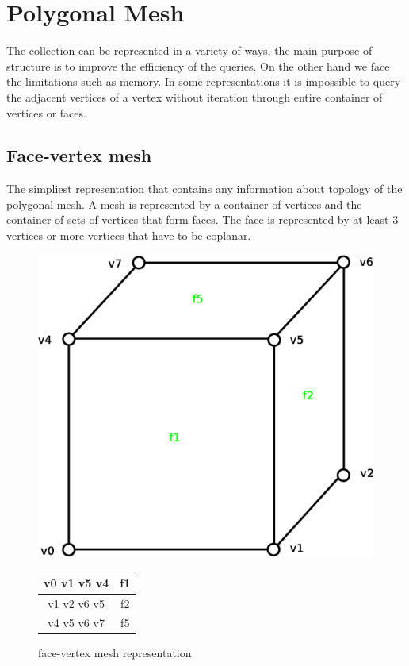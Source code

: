 \section{Polygonal Mesh}

The collection can be represented in a variety of ways, the main purpose of structure is to improve
the efficiency of the queries. On the other hand we face the limitations such as memory. In some
representations it is impossible to query the adjacent vertices of a vertex without iteration through
entire container of vertices or faces.

\subsection{Face-vertex mesh}
\label{sec:face-vertex}

The simpliest representation that contains any information about topology of the polygonal
mesh. A mesh is represented by a container of vertices and the container of sets of vertices that
form faces\cite{Zara2004}. The face is represented by at least 3 vertices or more vertices that have to be
coplanar.\\

\begin{figure}[h]

\begin{minipage}[hb]{0.65\linewidth}
\centering
\includegraphics[width=0.6\linewidth]{../img/fv_rep_mesh.eps}
\label{fig:figure1}
\end{minipage}
\hspace{0.5cm}
\begin{minipage}[hb]{0.25\linewidth}
\centering
\begin{tabular}{|c|c|}
\hline
\textsf{v0 v1 v5 v4} & \textsf{f1}\\
\hline
\textsf{v1 v2 v6 v5} & \textsf{f2}\\
\hline
\textsf{v4 v5 v6 v7} & \textsf{f5}\\
\hline
\end{tabular}
\label{fig:fv_mesh}
\end{minipage}

\caption{face-vertex mesh representation}
\end{figure}

